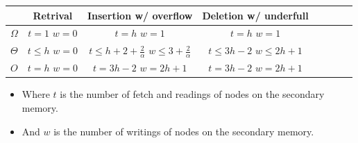 \documentclass{beamer}
\begin{document}
\begin{frame}
    \framebreak 
    \begin{center}
    \begin{tabular}{c@{|}ccccccc}
        \toprule
                       & Retrival & Insertion w/ overflow & Deletion w/ underfull \\
            \midrule
            \(\Omega\) & \(t = 1\) \(w = 0\) & \(t = h\) \(w = 1\) & \(t = h\) \(w = 1\) \\
            \midrule
            \(\Theta\) & \(t \leq h\) \(w = 0\) & \(t \leq h + 2 + \frac{2}{\alpha}\) \(w \leq 3 + \frac{2}{\alpha}\) & \(t \leq 3h - 2\) \(w \leq 2h +1\) \\
            \midrule
            \(O\) & \(t = h\) \(w = 0\) & \(t = 3h - 2\) \(w = 2h + 1\) & \(t = 3h - 2\) \(w = 2h + 1\) \\
        \toprule
    \end{tabular}
    \begin{itemize}
        \item Where \(t\) is the number of fetch and readings of nodes on the secondary memory.
        \item And \(w\) is the number of writings of nodes on the secondary memory.
    \end{itemize}
        \cite{bayer_organization_1972}
    \end{center}
\end{frame}
   
\end{document}
